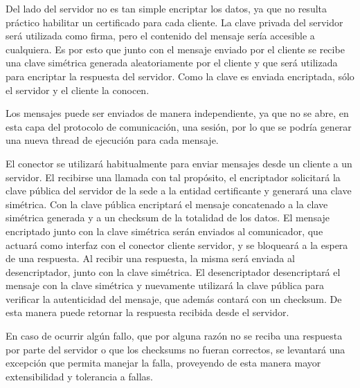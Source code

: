 Del lado del servidor no es tan simple encriptar los datos, ya que no resulta práctico habilitar un certificado para cada cliente. La clave privada del servidor será utilizada como firma, pero el contenido del mensaje sería accesible a cualquiera.
Es por esto que junto con el mensaje enviado por el cliente se recibe una clave simétrica generada aleatoriamente por el cliente y que será utilizada para encriptar la respuesta del servidor. Como la clave es enviada encriptada, sólo el servidor y el cliente la conocen.


Los mensajes puede ser enviados de manera independiente, ya que no se abre, en esta capa del protocolo de comunicación, una sesión, por lo que se podría generar una nueva thread de ejecución para cada mensaje. 

El conector se utilizará habitualmente para enviar mensajes desde un cliente a un servidor. El recibirse una llamada con tal propósito, el encriptador solicitará la clave pública del servidor de la sede a la entidad certificante y generará una clave simétrica. Con la clave pública encriptará el mensaje concatenado a la clave simétrica generada y a un checksum de la totalidad de los datos. El mensaje encriptado junto con la clave simétrica serán enviados al comunicador, que actuará como interfaz con el conector cliente servidor, y se bloqueará a la espera de una respuesta. Al recibir una respuesta, la misma será enviada al desencriptador, junto con la clave simétrica. El desencriptador desencriptará el mensaje con la clave simétrica y nuevamente utilizará la clave pública para verificar la autenticidad del mensaje, que además contará con un checksum. De esta manera puede retornar la respuesta recibida desde el servidor.


En caso de ocurrir algún fallo, que por alguna razón no se reciba una respuesta por parte del servidor o que los checksums no fueran correctos, se levantará una excepción que permita manejar la falla, proveyendo de esta manera mayor extensibilidad y tolerancia a fallas.





